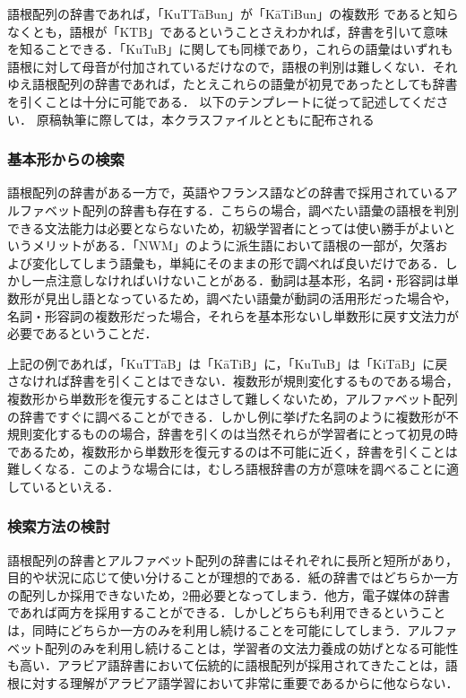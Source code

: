 \documentclass[technicalreport]{ieicej}
\begin{document}
語根配列の辞書であれば，「KuTTāBun」が「KāTiBun」の複数形 であると知らなくとも，語根が「KTB」であるということさえわかれば，辞書を引いて意味を知ることできる．「KuTuB」に関しても同様であり，これらの語彙はいずれも語根に対して母音が付加されているだけなので，語根の判別は難しくない．それゆえ語根配列の辞書であれば，たとえこれらの語彙が初見であったとしても辞書を引くことは十分に可能である．
以下のテンプレートに従って記述してください．
原稿執筆に際しては，本クラスファイルとともに配布される

\subsubsection{基本形からの検索}
語根配列の辞書がある一方で，英語やフランス語などの辞書で採用されているアルファベット配列の辞書も存在する．こちらの場合，調べたい語彙の語根を判別できる文法能力は必要とならないため，初級学習者にとっては使い勝手がよいというメリットがある．「NWM」のように派生語において語根の一部が，欠落および変化してしまう語彙も，単純にそのままの形で調べれば良いだけである．しかし一点注意しなければいけないことがある．動詞は基本形，名詞・形容詞は単数形が見出し語となっているため，調べたい語彙が動詞の活用形だった場合や，名詞・形容詞の複数形だった場合，それらを基本形ないし単数形に戻す文法力が必要であるということだ．

上記の例であれば，「KuTTāB」は「KāTiB」に，「KuTuB」は「KiTāB」に戻さなければ辞書を引くことはできない．複数形が規則変化するものである場合，複数形から単数形を復元することはさして難しくないため，アルファベット配列の辞書ですぐに調べることができる．しかし例に挙げた名詞のように複数形が不規則変化するものの場合，辞書を引くのは当然それらが学習者にとって初見の時であるため，複数形から単数形を復元するのは不可能に近く，辞書を引くことは難しくなる．このような場合には，むしろ語根辞書の方が意味を調べることに適しているといえる．

\subsubsection{検索方法の検討}
語根配列の辞書とアルファベット配列の辞書にはそれぞれに長所と短所があり，目的や状況に応じて使い分けることが理想的である．紙の辞書ではどちらか一方の配列しか採用できないため，2冊必要となってしまう．他方，電子媒体の辞書であれば両方を採用することができる．しかしどちらも利用できるということは，同時にどちらか一方のみを利用し続けることを可能にしてしまう．アルファベット配列のみを利用し続けることは，学習者の文法力養成の妨げとなる可能性も高い．アラビア語辞書において伝統的に語根配列が採用されてきたことは，語根に対する理解がアラビア語学習において非常に重要であるからに他ならない．
\end{document}
